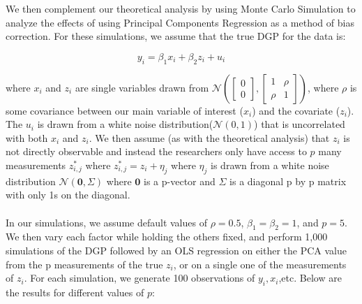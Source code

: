 \documentclass[12pt]{article}
\begin{document}
        We then complement our theoretical analysis by using Monte Carlo Simulation to analyze the effects of using Principal Components Regression as a method of bias correction. For these simulations, we assume that the true DGP for the data is:

        $$y_i = \beta_1 x_i + \beta_2 z_i + u_i$$

        where $x_i$ and $z_i$ are single variables drawn from $\mathcal{N}(\begin{bmatrix} 0\\ 0 \end{bmatrix}, \begin{bmatrix} 1 & \rho\\ \rho & 1\end{bmatrix})$, where $\rho$ is some covariance between our main variable of interest ($x_i$) and the covariate ($z_i$). The $u_i$ is drawn from a white noise distribution($\mathcal{N}(0,1)$) that is uncorrelated with both $x_i$ and $z_i$. We then assume (as with the theoretical analysis) that $z_i$ is not directly observable and instead the researchers only have access to $p$ many measurements $z_{i,j}^*$ where $z_{i,j}^* = z_i + \eta_j$ where $\eta_j$ is drawn from a white noise distribution $\mathcal{N}(\mathbf{0},\Sigma)$ where $\mathbf{0}$ is a p-vector and $\Sigma$ is a diagonal p by p matrix with only 1s on the diagonal.\\
        \\
        In our simulations, we assume default values of $\rho = 0.5$, $\beta_1 = \beta_2 = 1$, and $p=5$. We then vary each factor while holding the others fixed, and perform 1,000 simulations of the DGP followed by an OLS regression on either the PCA value from the p measurements of the true $z_i$, or on a single one of the measurements of $z_i$. For each simulation, we generate 100 observations of $y_i,x_i$,etc. Below are the results for different values of $p$:

        
\end{document}
